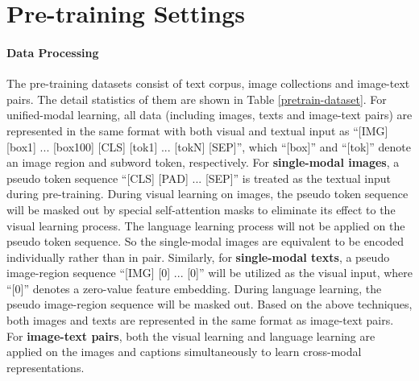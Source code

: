 \documentclass[11pt,a4paper]{article}
\begin{document}
\section{Pre-training Settings}
\label{sec:pretrain}

\paragraph{Data Processing}
The pre-training datasets consist of text corpus, image collections and image-text pairs.
The detail statistics of them are shown in Table \ref{pretrain-dataset}. 
For unified-modal learning, all data (including images, texts and image-text pairs) are represented in the same format with both visual and textual input as ``[IMG] [box1] ... [box100] [CLS] [tok1] ... [tokN] [SEP]'', which ``[box]'' and ``[tok]'' denote an image region and subword token, respectively.
For \textbf{single-modal images}, a pseudo token sequence ``[CLS] [PAD] ... [SEP]'' is treated as the textual input during pre-training.
During visual learning on images, the pseudo token sequence will be masked out by special self-attention masks to eliminate its effect to the visual learning process.
The language learning process will not be applied on the pseudo token sequence.
So the single-modal images are equivalent to be encoded individually rather than in pair.
Similarly, for \textbf{single-modal texts}, a pseudo image-region sequence ``[IMG] [0] ... [0]'' will be utilized as the visual input, where ``[0]'' denotes a zero-value feature embedding.
During language learning, the pseudo image-region sequence will be masked out.
Based on the above techniques, both images and texts are represented in the same format as image-text pairs.
For \textbf{image-text pairs}, both the visual learning and language learning are applied on the images and captions simultaneously to learn cross-modal representations. 
\end{document}
